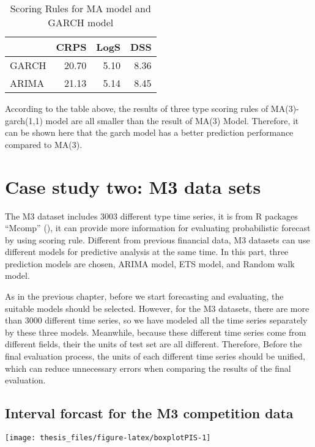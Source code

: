 \documentclass{monashthesis}
\theoremstyle{definition}
\theoremstyle{definition}
\theoremstyle{definition}
\theoremstyle{remark}
\begin{document}
\begin{table}

\caption{\label{tab:table2}Scoring Rules for MA model and GARCH model}
\centering
\begin{tabular}[t]{lrrr}
\toprule
  & CRPS & LogS & DSS\\
\midrule
GARCH & 20.70 & 5.10 & 8.36\\
ARIMA & 21.13 & 5.14 & 8.45\\
\bottomrule
\end{tabular}
\end{table}

According to the table above, the results of three type scoring rules of
MA(3)-garch(1,1) model are all smaller than the result of MA(3) Model.
Therefore, it can be shown here that the garch model has a better
prediction performance compared to MA(3).

\chapter{Case study two: M3 data
sets}\label{case-study-two-m3-data-sets}

The M3 dataset includes 3003 different type time series, it is from R
packages ``Mcomp'' (\textcite{RH182}), it can provide more information
for evaluating probabilistic forecast by using scoring rule. Different
from previous financial data, M3 datasets can use different models for
predictive analysis at the same time. In this part, three prediction
models are chosen, ARIMA model, ETS model, and Random walk model.

As in the previous chapter, before we start forecasting and evaluating,
the suitable models should be selected. However, for the M3 datasets,
there are more than 3000 different time series, so we have modeled all
the time series separately by these three models. Meanwhile, because
these different time series come from different fields, their the units
of test set are all different. Therefore, Before the final evaluation
process, the units of each different time series should be unified,
which can reduce unnecessary errors when comparing the results of the
final evaluation.

\section{Interval forcast for the M3 competition
data}\label{interval-forcast-for-the-m3-competition-data}

\texttt{[image: thesis\_files/figure-latex/boxplotPIS-1]}
\end{document}
